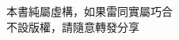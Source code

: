 \begin{titlepage}
	\centering %
	\scshape %
	\vspace*{1.5\baselineskip} %

	
		\vspace{6\baselineskip} %
	{	
        \Huge \bookname
    }
		\vspace{5\baselineskip} %
	
	{\Large \authorname}
	{
	\vspace*{4\baselineskip}
	\\\bookdate\;\bookversionstring\\
	\authoraddress\\
	\authoremail\\
	\vspace*{0.5\baselineskip}
	\authorhomepage\\
	\vspace*{4\baselineskip}
	本書純屬虛構，如果雷同實屬巧合\\
	\cczero\;不設版權，請隨意轉發分享
	}


\end{titlepage}
